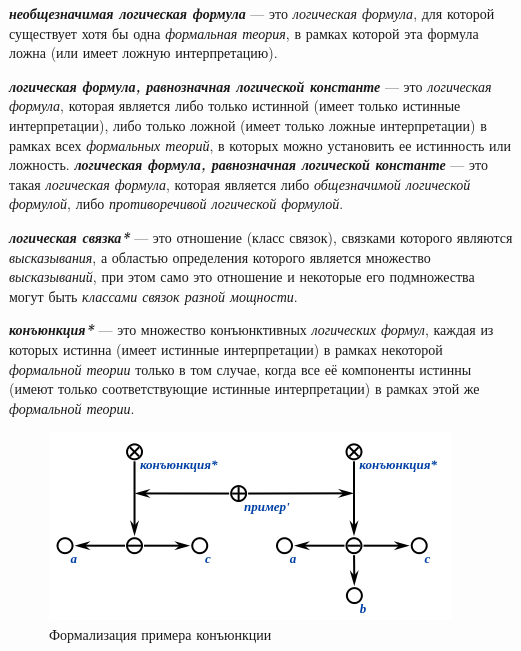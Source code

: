 \textbf{\textit{необщезначимая логическая формула}} --- это \textit{логическая формула}, для которой существует хотя бы одна \textit{формальная теория}, в рамках которой эта формула ложна (или имеет ложную интерпретацию).

\textbf{\textit{логическая формула, равнозначная логической константе}} --- это \textit{логическая формула}, которая является либо только истинной (имеет только истинные интерпретации), либо только ложной (имеет только ложные интерпретации) в рамках всех \textit{формальных теорий}, в которых можно установить ее истинность или ложность.
\textbf{\textit{логическая формула, равнозначная логической константе}} --- это такая \textit{логическая формула}, которая является либо \textit{общезначимой логической формулой}, либо \textit{противоречивой логической формулой}.

\begin{SCn}
\end{SCn}

\textbf{\textit{логическая связка*}} --- это отношение (класс связок), связками которого являются \textit{высказывания}, а областью определения которого является множество \textit{высказываний}, при этом само это отношение и некоторые его подмножества могут быть \textit{классами связок разной мощности}.

\begin{SCn}
\end{SCn}

\textbf{\textit{конъюнкция*}} --- это множество конъюнктивных \textit{логических формул}, каждая из которых истинна (имеет истинные интерпретации) в рамках некоторой \textit{формальной теории} только в том случае, когда все её компоненты истинны (имеют только соответствующие истинные интерпретации) в рамках этой же \textit{формальной теории}. 

\begin{figure}[H]
	\includegraphics[scale=0.8]{author/part2/figures/logic/conjunction.png}
	\caption{Формализация примера конъюнкции}
	\label{fig:conjunction}
\end{figure}

